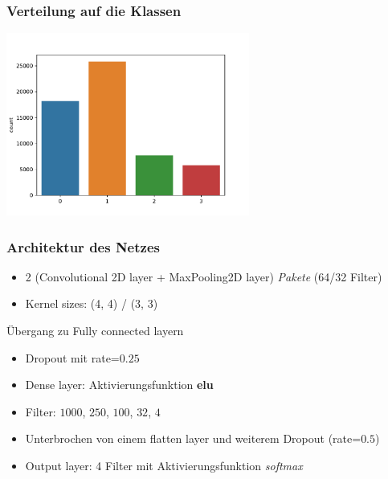 \documentclass[aspectratio=1610, professionalfonts, 9pt]{beamer}
\begin{document}
\begin{frame}
    \frametitle{Verteilung auf die Klassen}
    \centering
    \includegraphics[width=0.6\textwidth]{images/countplot_relu.pdf}\\
\end{frame}

\begin{frame}
    \frametitle{Architektur des Netzes}
    \begin{itemize}
        \item 2 (Convolutional 2D layer + MaxPooling2D layer) \textit{Pakete} (64/32 Filter)
        \item Kernel sizes: (4, 4) / (3, 3)
    \end{itemize}
    Übergang zu Fully connected layern
    \begin{itemize}
        \item Dropout mit rate=$0.25$
        \item Dense layer: Aktivierungsfunktion \textbf{elu}
        \item Filter: $1000$, $250$, $100$, $32$, $4$
        \item Unterbrochen von einem flatten layer und weiterem Dropout (rate=$0.5$)
        \item Output layer: 4 Filter mit Aktivierungsfunktion \textit{softmax}
    \end{itemize}
\end{frame}
\end{document}
